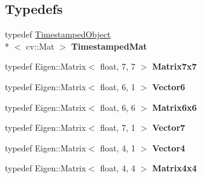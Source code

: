 \subsection*{Typedefs}
\begin{DoxyCompactItemize}
\item 
\hypertarget{namespacelsd__slam_a164129dec878f43d8f4ddf71b65315b7}{typedef \hyperlink{structlsd__slam_1_1_timestamped_object}{Timestamped\-Object}\\*
$<$ cv\-::\-Mat $>$ {\bfseries Timestamped\-Mat}}\label{namespacelsd__slam_a164129dec878f43d8f4ddf71b65315b7}

\item 
\hypertarget{namespacelsd__slam_ac36c53d500ca0fe93db2390a5f10d16c}{typedef Eigen\-::\-Matrix$<$ float, 7, 7 $>$ {\bfseries Matrix7x7}}\label{namespacelsd__slam_ac36c53d500ca0fe93db2390a5f10d16c}

\item 
\hypertarget{namespacelsd__slam_af35a9b8f79122d249c3f1ca19fdae233}{typedef Eigen\-::\-Matrix$<$ float, 6, 1 $>$ {\bfseries Vector6}}\label{namespacelsd__slam_af35a9b8f79122d249c3f1ca19fdae233}

\item 
\hypertarget{namespacelsd__slam_a59e58b491be3942e6e1f5a5aab9ac64e}{typedef Eigen\-::\-Matrix$<$ float, 6, 6 $>$ {\bfseries Matrix6x6}}\label{namespacelsd__slam_a59e58b491be3942e6e1f5a5aab9ac64e}

\item 
\hypertarget{namespacelsd__slam_a39aa3611094c572dcdbe4dd9e27d3126}{typedef Eigen\-::\-Matrix$<$ float, 7, 1 $>$ {\bfseries Vector7}}\label{namespacelsd__slam_a39aa3611094c572dcdbe4dd9e27d3126}

\item 
\hypertarget{namespacelsd__slam_abcef3cc27531a7e1f39b78859b97dff7}{typedef Eigen\-::\-Matrix$<$ float, 4, 1 $>$ {\bfseries Vector4}}\label{namespacelsd__slam_abcef3cc27531a7e1f39b78859b97dff7}

\item 
\hypertarget{namespacelsd__slam_ad99d5e8a301e2f3eb7f7bacd30e57b58}{typedef Eigen\-::\-Matrix$<$ float, 4, 4 $>$ {\bfseries Matrix4x4}}\label{namespacelsd__slam_ad99d5e8a301e2f3eb7f7bacd30e57b58}

\end{DoxyCompactItemize}
